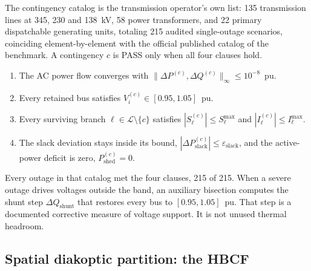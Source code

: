The contingency catalog is the transmission operator's own list: 135 transmission lines at 345, 230 and 138~kV, 58 power transformers, and 22 primary dispatchable generating units, totaling 215 audited single-outage scenarios, coinciding element-by-element with the official published catalog of the benchmark. A contingency $c$ is PASS only when all four clauses hold.
\begin{enumerate}
\item The AC power flow converges with $\|\Delta P^{(c)}, \Delta Q^{(c)}\|_{\infty} \le 10^{-8}$~pu.
\item Every retained bus satisfies $V_i^{(c)} \in [0.95, 1.05]$~pu.
\item Every surviving branch $\ell \in \mathcal{L}\setminus\{c\}$ satisfies $|S_\ell^{(c)}| \le S_\ell^{\max}$ and $|I_\ell^{(c)}| \le I_\ell^{\max}$.
\item The slack deviation stays inside its bound, $|\Delta P_{\mathrm{slack}}^{(c)}| \le \varepsilon_{\mathrm{slack}}$, and the active-power deficit is zero, $P_{\mathrm{shed}}^{(c)}=0$.
\end{enumerate}
Every outage in that catalog met the four clauses, 215 of 215. When a severe outage drives voltages outside the band, an auxiliary bisection computes the shunt step $\Delta Q_{\mathrm{shunt}}$ that restores every bus to $[0.95, 1.05]$~pu. That step is a documented corrective measure of voltage support. It is not unused thermal headroom.

\subsection{Spatial diakoptic partition: the HBCF}
\label{sub:hbcf}

